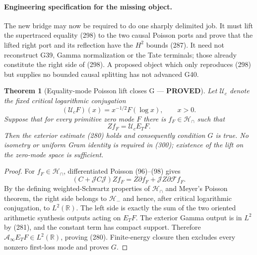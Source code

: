 \documentclass[11pt]{article}
\newtheorem{theorem}{Theorem}
\newcommand{\PROVED}{\textcolor{green!45!black}{\textbf{PROVED}}}
\begin{document}
\paragraph{Engineering specification for the missing object.}
The new bridge may now be required to do one sharply delimited job.  It must
lift the supertraced equality (298) to the two causal Poisson ports and prove
that the lifted right port and its reflection have the $H^2$ bounds (287).
It need not reconstruct G39, Gamma normalization or the Tate terminals;
those already constitute the right side of (298).  A proposed object which
only reproduces (298) but supplies no bounded causal splitting has not
advanced G40.

\begin{theorem}[Equality-mode Poisson lift closes G --- \PROVED]
Let $\mathcal U_c$ denote the fixed critical logarithmic conjugation
\begin{equation}
 (\mathcal U_cF)(x)=x^{-1/2}F(\log x),
 \qquad x>0.                                          \tag{299}
\end{equation}
Suppose that for every primitive zero mode $F$ there is
$f_F\in\mathcal H_\cap$ such that
\begin{equation}
 Zf_F=\mathcal U_cE_TF.                               \tag{300}
\end{equation}
Then the exterior estimate (280) holds and consequently condition $G$ is
true.  No isometry or uniform Gram identity is required in (300); existence
of the lift on the zero-mode space is sufficient.
\end{theorem}

\begin{proof}
For $f_F\in\mathcal H_\cap$, differentiated Poisson (96)--(98) gives
\begin{equation}
 (C+\mathscr JC\mathscr J)Zf_F
 =Z\partial f_F+\mathscr JZ\partial\mathcal Ff_F.     \tag{301}
\end{equation}
By the defining weighted-Schwartz properties of $\mathcal H_\cap$ and
Meyer's Poisson theorem, the right side belongs to $\mathcal H_-$ and hence,
after critical logarithmic conjugation, to $L^2(\mathbb R)$.  The left side
is exactly the sum of the two oriented arithmetic synthesis outputs acting
on $E_TF$.  The exterior Gamma output is in $L^2$ by (281), and the constant
term has compact support.  Therefore
$\mathcal A_\infty E_TF\in L^2(\mathbb R)$, proving (280).  Finite-energy
closure then excludes every nonzero first-loss mode and proves $G$.
\end{proof}
\end{document}
